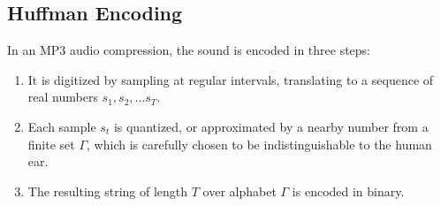 \subsection{Huffman Encoding}
In an MP3 audio compression, the sound is encoded in three steps:
\begin{enumerate}
  \item It is digitized by sampling at regular intervals, translating to a sequence of real numbers $s_1, s_2, \ldots s_T$.
  \item Each sample $s_t$ is quantized, or approximated by a nearby number from a finite set $\Gamma$, which is carefully chosen to be indistinguishable to the human ear.
  \item The resulting string of length $T$ over alphabet $\Gamma $ is encoded in binary.
\end{enumerate}


